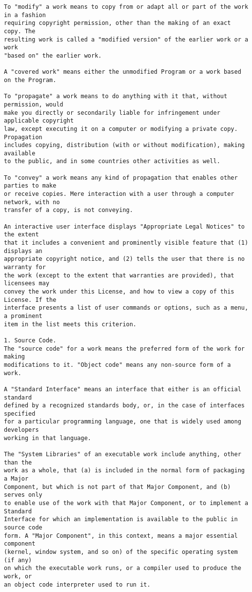 \begin{verbatim}
To "modify" a work means to copy from or adapt all or part of the work in a fashion
requiring copyright permission, other than the making of an exact copy. The
resulting work is called a "modified version" of the earlier work or a work
"based on" the earlier work.

A "covered work" means either the unmodified Program or a work based on the Program.

To "propagate" a work means to do anything with it that, without permission, would
make you directly or secondarily liable for infringement under applicable copyright
law, except executing it on a computer or modifying a private copy. Propagation
includes copying, distribution (with or without modification), making available
to the public, and in some countries other activities as well.

To "convey" a work means any kind of propagation that enables other parties to make
or receive copies. Mere interaction with a user through a computer network, with no
transfer of a copy, is not conveying.

An interactive user interface displays "Appropriate Legal Notices" to the extent
that it includes a convenient and prominently visible feature that (1) displays an
appropriate copyright notice, and (2) tells the user that there is no warranty for
the work (except to the extent that warranties are provided), that licensees may
convey the work under this License, and how to view a copy of this License. If the
interface presents a list of user commands or options, such as a menu, a prominent
item in the list meets this criterion.

1. Source Code.
The "source code" for a work means the preferred form of the work for making
modifications to it. "Object code" means any non-source form of a work.

A "Standard Interface" means an interface that either is an official standard
defined by a recognized standards body, or, in the case of interfaces specified
for a particular programming language, one that is widely used among developers
working in that language.

The "System Libraries" of an executable work include anything, other than the
work as a whole, that (a) is included in the normal form of packaging a Major
Component, but which is not part of that Major Component, and (b) serves only
to enable use of the work with that Major Component, or to implement a Standard
Interface for which an implementation is available to the public in source code
form. A "Major Component", in this context, means a major essential component
(kernel, window system, and so on) of the specific operating system (if any)
on which the executable work runs, or a compiler used to produce the work, or
an object code interpreter used to run it.


\end{verbatim}
